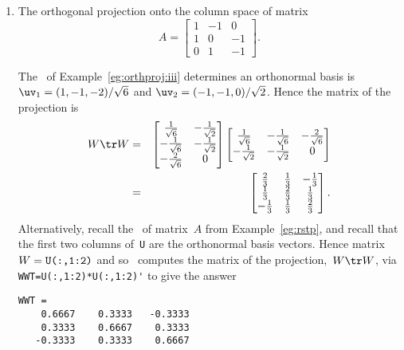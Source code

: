 \begin{example}
\begin{enumerate}
\item The orthogonal projection onto the column space of matrix
\begin{equation*}
A=\begin{bmatrix} 1&-1&0\\ 1&0&-1\\ 0&1&-1 \end{bmatrix}.
\end{equation*}
\begin{solution} 
The \svd\ of Example~\ref{eg:orthproj:iii} determines an orthonormal basis is \(\uv_1=(1,-1,-2)/\sqrt6\) and \(\uv_2=(-1,-1,0)/\sqrt2\).
Hence the matrix of the projection is
\begin{eqnarray*}
W\tr W&=&\begin{bmatrix} \frac1{\sqrt6}&-\frac1{\sqrt2}\\-\frac1{\sqrt6}&-\frac1{\sqrt2}\\-\frac2{\sqrt6}&0 \end{bmatrix}
\begin{bmatrix} \frac1{\sqrt6}&-\frac1{\sqrt6}&-\frac2{\sqrt6}\\ -\frac1{\sqrt2}&-\frac1{\sqrt2}&0\end{bmatrix}
\\&=&\begin{bmatrix} \frac23&\frac13&-\frac13\\\frac13&\frac23&\frac13\\-\frac13&\frac13&\frac23 \end{bmatrix}.
\end{eqnarray*}
Alternatively, recall the \svd\ of matrix~\(A\) from Example~\ref{eg:rstp}, and recall that the first two columns of~\verb|U| are the orthonormal basis vectors.  
Hence matrix \(W=\verb|U(:,1:2)|\) and so \script\ computes the matrix of the projection,~\(W\tr W\), via \verb|WWT=U(:,1:2)*U(:,1:2)'| to give the answer
\setbox\ajrqrbox\hbox{}%
\marginpar{\usebox{\ajrqrbox\\[2ex]}}%
\begin{verbatim}
WWT =
    0.6667    0.3333   -0.3333
    0.3333    0.6667    0.3333
   -0.3333    0.3333    0.6667
\end{verbatim}
\end{solution}



\end{enumerate}
\end{example}
